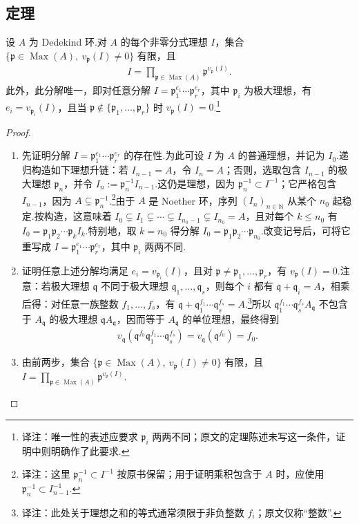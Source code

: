 \subsection{定理}\label{sec:nt-3-3-4}
\begin{theorem*}
设 $A$ 为 Dedekind 环.对 $A$ 的每个非零分式理想 $I$，集合 $\{\mathfrak p\in\operatorname{Max}(A),\ v_{\mathfrak p}(I)\ne0\}$ 有限，且
\begin{align*}
I=\prod_{\mathfrak p\in\operatorname{Max}(A)}\mathfrak p^{v_{\mathfrak p}(I)}.
\end{align*}
此外，此分解唯一，即对任意分解 $I=\mathfrak p_1^{e_1}\cdots\mathfrak p_r^{e_r}$，其中 $\mathfrak p_i$ 为极大理想，有 $e_i=v_{\mathfrak p_i}(I)$，且当 $\mathfrak p\notin\{\mathfrak p_1,\ldots,\mathfrak p_r\}$ 时 $v_{\mathfrak p}(I)=0$.\footnote{译注：唯一性的表述应要求 $\mathfrak p_i$ 两两不同；原文的定理陈述未写这一条件，证明中则明确作了此要求.}
\end{theorem*}
\begin{proof}
\begin{enumerate}[label=\arabic*)]
\item 先证明分解 $I=\mathfrak p_1^{e_1}\cdots\mathfrak p_r^{e_r}$ 的存在性.为此可设 $I$ 为 $A$ 的普通理想，并记为 $I_0$.递归构造如下理想升链：若 $I_{n-1}=A$，令 $I_n=A$；否则，选取包含 $I_{n-1}$ 的极大理想 $\mathfrak p_n$，并令 $I_n:=\mathfrak p_n^{-1}I_{n-1}$.这仍是理想，因为 $\mathfrak p_n^{-1}\subset I^{-1}$；它严格包含 $I_{n-1}$，因为 $A\subsetneq\mathfrak p_n^{-1}$.\footnote{译注：这里 $\mathfrak p_n^{-1}\subset I^{-1}$ 按原书保留；用于证明乘积包含于 $A$ 时，应使用 $\mathfrak p_n^{-1}\subset I_{n-1}^{-1}$.}由于 $A$ 是 Noether 环，序列 $(I_n)_{n\in\mathbb N}$ 从某个 $n_0$ 起稳定.按构造，这意味着 $I_0\subsetneq I_1\subsetneq\cdots\subsetneq I_{n_0-1}\subsetneq I_{n_0}=A$，且对每个 $k\le n_0$ 有 $I_0=\mathfrak p_1\mathfrak p_2\cdots\mathfrak p_kI_k$.特别地，取 $k=n_0$ 得分解 $I_0=\mathfrak p_1\mathfrak p_2\cdots\mathfrak p_{n_0}$.改变记号后，可将它重写成 $I=\mathfrak p_1^{e_1}\cdots\mathfrak p_r^{e_r}$，其中 $\mathfrak p_i$ 两两不同.
\item 证明任意上述分解均满足 $e_i=v_{\mathfrak p_i}(I)$，且对 $\mathfrak p\ne\mathfrak p_1,\ldots,\mathfrak p_r$，有 $v_{\mathfrak p}(I)=0$.注意：若极大理想 $\mathfrak q$ 不同于极大理想 $\mathfrak q_1,\ldots,\mathfrak q_s$，则每个 $i$ 都有 $\mathfrak q+\mathfrak q_i=A$，相乘后得：对任意一族整数 $f_1,\ldots,f_s$，有 $\mathfrak q+\mathfrak q_1^{f_1}\cdots\mathfrak q_s^{f_s}=A$.\footnote{译注：此处关于理想之和的等式通常须限于非负整数 $f_i$；原文仅称``整数''.}所以 $\mathfrak q_1^{f_1}\cdots\mathfrak q_s^{f_s}A_{\mathfrak q}$ 不包含于 $A_{\mathfrak q}$ 的极大理想 $\mathfrak qA_{\mathfrak q}$，因而等于 $A_{\mathfrak q}$ 的单位理想，最终得到
\begin{align*}
v_{\mathfrak q}(\mathfrak q^{f_0}\mathfrak q_1^{f_1}\cdots\mathfrak q_s^{f_s})=v_{\mathfrak q}(\mathfrak q^{f_0})=f_0.
\end{align*}
\item 由前两步，集合 $\{\mathfrak p\in\operatorname{Max}(A),\ v_{\mathfrak p}(I)\ne0\}$ 有限，且 $I=\prod_{\mathfrak p\in\operatorname{Max}(A)}\mathfrak p^{v_{\mathfrak p}(I)}$.
\end{enumerate}
\end{proof}
